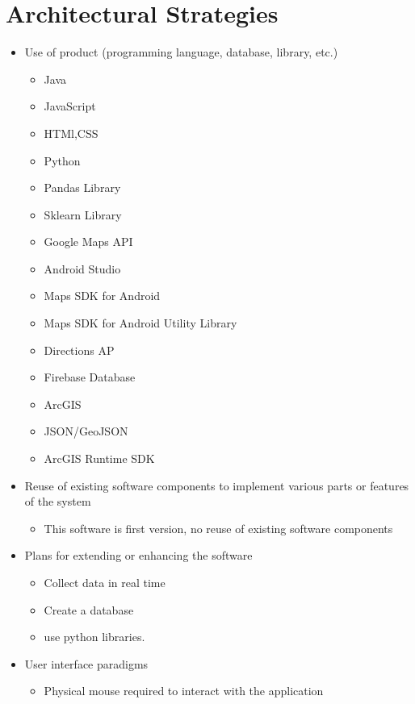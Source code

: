\documentclass[a4paper,12pt]{article}
\begin{document}
\section{Architectural Strategies}
\begin{itemize}
    \item Use of product (programming language, database, library, etc.)
        \begin{itemize}
            \item Java
            \item JavaScript
            \item HTMl,CSS
            \item Python
            \item Pandas Library
            \item Sklearn Library
            \item Google Maps API
            \item Android Studio
            \item Maps SDK for Android
            \item Maps SDK for Android Utility Library
            \item Directions AP
            \item Firebase Database
            \item ArcGIS
            \item JSON/GeoJSON
            \item ArcGIS Runtime SDK
        \end{itemize}
    \item Reuse of existing software components to implement various parts or features of the system
        \begin{itemize}
            \item This software is first version, no reuse of existing software components
        \end{itemize}
    \item Plans for extending or enhancing the software
        \begin{itemize}
            \item Collect data in real time
            \item Create a database 
            \item use python libraries. 
        \end{itemize}
    \item User interface paradigms
        \begin{itemize}
            \item Physical mouse required to interact with the application

\end{itemize}
\end{itemize}
\end{document}
